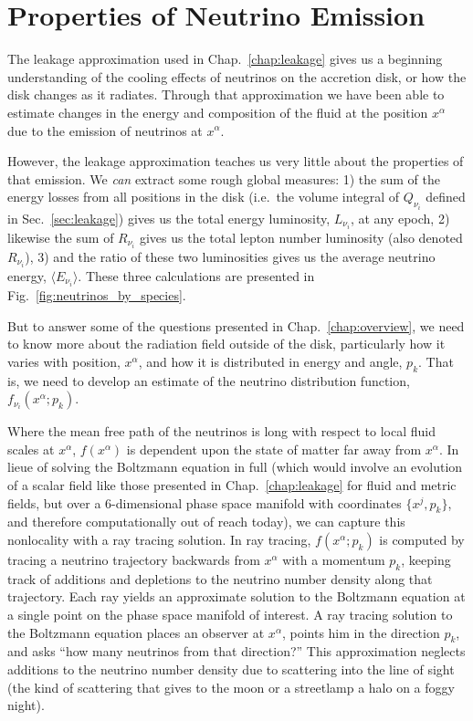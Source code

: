 \chapter{Properties of Neutrino Emission}
\label{chap:ray_tracing}

The leakage approximation used in Chap.~\ref{chap:leakage} gives us a beginning
understanding of the cooling effects of neutrinos on the accretion disk, or
how the disk changes as it radiates. Through that approximation we have been able
to estimate changes in the energy and composition of the fluid at the position
$x^\alpha$ due to the emission of neutrinos at $x^\alpha$.

However, the leakage approximation teaches us very little about the properties of
that emission. We \emph{can} extract some rough global measures:
1) the sum of the energy losses from all positions in the disk (i.e.\
the volume integral of $Q_{\nu_i}$ defined in Sec.~\ref{sec:leakage})
gives us the total energy luminosity, $L_{\nu_i}$, at any epoch,
2) likewise the sum of $R_{\nu_i}$ gives us the total lepton number luminosity
(also denoted $R_{\nu_i}$),
3) and the ratio of these two luminosities gives us the average neutrino energy,
$\langle E_{\nu_i} \rangle$. These three calculations are presented in
Fig.~\ref{fig:neutrinos_by_species}.

But to answer some of the questions presented in Chap.~\ref{chap:overview}, we
need to know more about the radiation field outside of the disk, particularly
how it varies with position, $x^\alpha$, and how it is distributed in energy and
angle, $p_k$.
That is, we need to develop an estimate of the neutrino distribution function,
$f_{\nu_i}(x^\alpha;p_k)$.

Where the mean free path of the neutrinos is long with respect to local fluid
\todo{show this is the case}
scales at $x^\alpha$, $f(x^\alpha)$ is dependent upon the state of matter far
away from $x^\alpha$. In lieue of solving the Boltzmann equation in full
\todo{ref eqn in Chap.~\ref{chap:intro}}
(which would involve an evolution of a scalar field like those presented in
Chap.~\ref{chap:leakage} for fluid and metric fields, but over a 6-dimensional
phase space manifold with coordinates $\{x^j,p_k\}$, and therefore
computationally out of reach today),
we can capture this nonlocality with a ray tracing solution.
In ray tracing, $f(x^\alpha;p_k)$ is computed by tracing a neutrino trajectory
backwards from $x^\alpha$ with a momentum $p_k$, keeping track of additions
and depletions to the neutrino number density along that trajectory.
Each ray yields an approximate solution to the Boltzmann equation at a
single point on the phase space manifold of interest. A ray
tracing solution to the Boltzmann equation places an observer at $x^\alpha$,
points him in the direction $p_k$, and asks ``how many neutrinos from that
direction?''
This approximation neglects additions to the neutrino number density due to
scattering into the line of sight (the kind of scattering that gives to the
moon or a streetlamp a halo on a foggy night).

